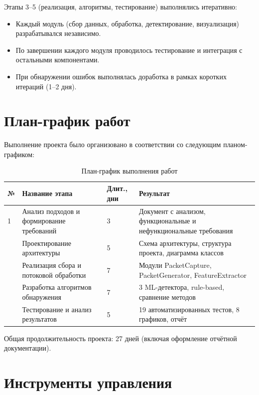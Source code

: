 Этапы 3--5 (реализация, алгоритмы, тестирование) выполнялись итеративно:

\begin{itemize}
    \item Каждый модуль (сбор данных, обработка, детектирование, визуализация) разрабатывался независимо.
    \item По завершении каждого модуля проводилось тестирование и интеграция с остальными компонентами.
    \item При обнаружении ошибок выполнялась доработка в рамках коротких итераций (1--2 дня).
\end{itemize}

\section{План-график работ}

Выполнение проекта было организовано в соответствии со следующим планом-графиком:

\begin{table}[H]
\centering
\caption{План-график выполнения работ}
\label{tab:schedule}
\begin{tabular}{p{1.5cm}p{4cm}p{2.5cm}p{8cm}}
\toprule
\textbf{№} & \textbf{Название этапа} & \textbf{Длит., дни} & \textbf{Результат} \\
\midrule
1 & Анализ подходов и формирование требований & 3 & Документ с анализом, функциональные и нефункциональные требования \\
\addlinespace
2 & Проектирование архитектуры & 5 & Схема архитектуры, структура проекта, диаграмма классов \\
\addlinespace
3 & Реализация сбора и потоковой обработки & 7 & Модули PacketCapture, PacketGenerator, FeatureExtractor \\
\addlinespace
4 & Разработка алгоритмов обнаружения & 7 & 3 ML-детектора, rule-based, сравнение методов \\
\addlinespace
5 & Тестирование и анализ результатов & 5 & 19 автоматизированных тестов, 8 графиков, отчёт \\
\bottomrule
\end{tabular}
\end{table}

Общая продолжительность проекта: 27 дней (включая оформление отчётной документации).

\section{Инструменты управления}

